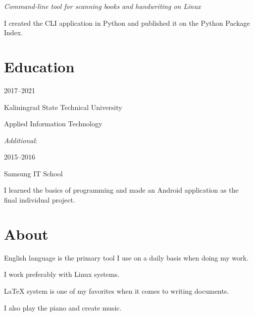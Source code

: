 \documentclass [12pt] {article}
\begin{document}
\emph {Command-line tool for scanning books and handwriting on Linux}

I created the CLI application in Python
and published it on the Python Package Index.

\section {Education}

2017--2021

Kaliningrad State Technical University

Applied Information Technology

\bigskip

\emph {Additional}:

2015--2016

Samsung IT School

I learned the basics of programming
and made an Android application as the final individual project.

\section {About}

English language is the primary tool
I use on a daily basis when doing my work.

I work preferably with Linux systems.

LaTeX system is one of my favorites
when it comes to writing documents.

I also play the piano and create music.
\end{document}
